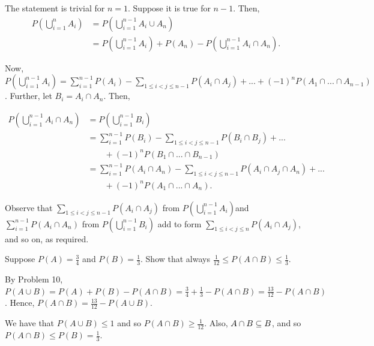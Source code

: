 \begin{solution}
    The statement is trivial for $n = 1$. Suppose it is true for $n - 1$. Then, 
    \begin{align*}
        P \left( \bigcup_{i = 1}^n A_i \right) &= P \left( \bigcup_{i = 1}^{n - 1} A_i \cup A_n \right) \\
        &= P \left( \bigcup_{i = 1}^{n - 1} A_i \right) + P(A_n) - P \left( \bigcup_{i = 1}^{n - 1} A_i \cap A_n \right).
    \end{align*}

    Now, $P \left( \bigcup_{i = 1}^{n - 1} A_i \right) = \sum_{i = 1}^{n - 1} P(A_i) - \sum_{1 \leq i < j \leq n - 1} P(A_i \cap A_j) +... + (-1)^n P(A_1 \cap ... \cap A_{n - 1})$. Further, let $B_i = A_i \cap A_n$. Then, 
    
    \begin{align*}
        P \left( \bigcup_{i = 1}^{n - 1} A_i \cap A_n \right) &= P \left( \bigcup_{i = 1}^{n - 1} B_i \right) \\
        &= \sum_{i = 1}^{n - 1} P(B_i) - \sum_{1 \leq i < j \leq n - 1} P(B_i \cap B_j) +... \\ &  \quad\quad + (-1)^n P(B_1 \cap ... \cap B_{n - 1}) \\
        &= \sum_{i = 1}^{n - 1} P(A_i \cap A_n) -  \sum_{1 \leq i < j \leq n - 1} P(A_i \cap A_j \cap A_n) + ... \\ & \quad\quad + (-1)^n P(A_1 \cap ... \cap A_n).
    \end{align*}

    Observe that $\sum_{1 \leq i < j \leq n - 1} P(A_i \cap A_j)$ from $P \left( \bigcup_{i = 1}^{n - 1} A_i \right)$and $\sum_{i = 1}^{n - 1} P(A_i \cap A_n)$ from $P \left( \bigcup_{i = 1}^{n - 1} B_i \right)$ add to form $\sum_{1 \leq i < j \leq n}P(A_i \cap A_j)$, and so on, as required.
\end{solution}


\begin{problem}
    Suppose $P(A) = \frac{3}{4}$ and $P(B) = \frac{1}{3}$. Show that always $\frac{1}{12} \leq P(A \cap B) \leq \frac{1}{3}$.
\end{problem}

\begin{solution}
    By Problem 10, $P(A \cup B) = P(A) + P(B) - P(A \cap B) = \frac{3}{4} + \frac{1}{3} - P(A \cap B) = \frac{13}{12} - P(A \cap B)$. Hence, $P(A \cap B) = \frac{13}{12} - P(A \cup B)$.

    We have that $P(A \cup B) \leq 1$ and so $P(A \cap B) \geq \frac{1}{12}$. Also, $A \cap B \subseteq B$, and so $P(A \cap B) \leq P(B) = \frac{1}{3}$.    
\end{solution}

